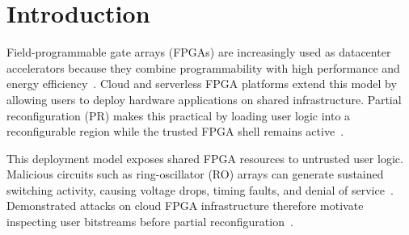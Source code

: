 \documentclass[acmsmall]{acmart}
\begin{document}



\maketitle

\section{Introduction}
\label{sec:introduction}

Field-programmable gate arrays (FPGAs) are increasingly used as datacenter
accelerators because they combine programmability with high performance and
energy efficiency~\cite{caulfield2016cloud,bobda2022future}. Cloud and
serverless FPGA platforms extend this model by allowing users to deploy
hardware applications on shared infrastructure. Partial reconfiguration (PR)
makes this practical by loading user logic into a reconfigurable region while
the trusted FPGA shell remains active~\cite{korolija2020os,ramhorst2025coyote}.

This deployment model exposes shared FPGA resources to untrusted user logic.
Malicious circuits such as ring-oscillator (RO) arrays can generate sustained
switching activity, causing voltage drops, timing faults, and denial of
service~\cite{gnad2017voltage,la2021denial,provelengios2020power,
boutros2020neighbors}. Demonstrated attacks on cloud FPGA infrastructure
therefore motivate inspecting user bitstreams before partial
reconfiguration~\cite{la2021denial}.
\end{document}
